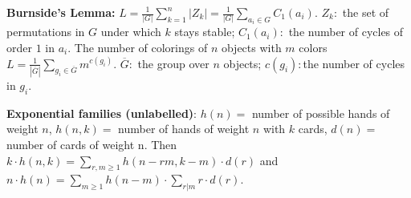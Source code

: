 \documentclass[landscape,a4paper,twocolumn,10pt]{report}
\begin{document}
{\bf Burnside's Lemma:} $L=\frac{1}{|G|}\sum_{k=1}^n|Z_k|=\frac{1}{|G|}\sum_{a_i \in G}C_1(a_i)$. $Z_k:$ the set of permutations in $G$ under which $k$ stays stable; $C_1(a_i):$ the number of cycles of order $1$ in $a_i$.  The number of colorings of $n$ objects with $m$ colors $L=\frac{1}{|\overline{G}|}\sum_{g_i \in \overline{G}}{m^{c(g_i)}}$. $\overline{G}:$ the group over $n$ objects; $c(g_i):$the number of cycles in $g_i$.

\textbf{Exponential families (unlabelled)}: $h(n) =$ number of possible hands of weight $n$,
$h(n,k) =$ number of hands of weight $n$ with $k$ cards, $d(n) =$ number of cards of weight n.
Then $k \cdot h(n, k) = \sum_{r, m \ge 1} h(n - rm, k - m)\cdot d(r)$ and
$n \cdot h(n) = \sum_{m \ge 1} h(n - m) \cdot \sum_{r | m} r\cdot d(r)$.
\end{document}
